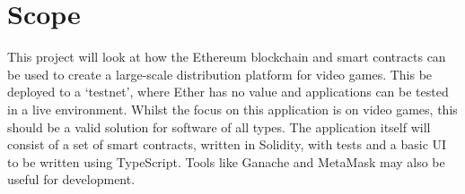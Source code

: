 \section{Scope}

This project will look at how the Ethereum blockchain and smart contracts can be used to create a large-scale distribution platform for video games. This be deployed to a `testnet', where Ether has no value and applications can be tested in a live environment. Whilst the focus on this application is on video games, this should be a valid solution for software of all types.
\x
The application itself will consist of a set of smart contracts, written in Solidity, with tests and a basic UI to be written using TypeScript. Tools like Ganache and MetaMask may also be useful for development.